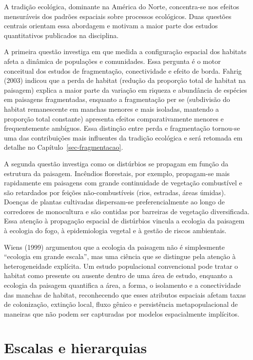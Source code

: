 \documentclass[
  portuguese,
  11pt,
  a4paper,
  open=any]{scrbook}
\begin{document}
A tradição ecológica, dominante na América do Norte, concentra-se nos
efeitos mensuráveis dos padrões espaciais sobre processos ecológicos.
Duas questões centrais orientam essa abordagem e motivam a maior parte
dos estudos quantitativos publicados na disciplina.

A primeira questão investiga em que medida a configuração espacial dos
habitats afeta a dinâmica de populações e comunidades. Essa pergunta é o
motor conceitual dos estudos de fragmentação, conectividade e efeito de
borda. Fahrig (2003) indicou que a perda de habitat (redução da
proporção total de habitat na paisagem) explica a maior parte da
variação em riqueza e abundância de espécies em paisagens fragmentadas,
enquanto a fragmentação per se (subdivisão do habitat remanescente em
manchas menores e mais isoladas, mantendo a proporção total constante)
apresenta efeitos comparativamente menores e frequentemente ambíguos.
Essa distinção entre perda e fragmentação tornou-se uma das
contribuições mais influentes da tradição ecológica e será retomada em
detalhe no Capítulo~\ref{sec-fragmentacao}.

A segunda questão investiga como os distúrbios se propagam em função da
estrutura da paisagem. Incêndios florestais, por exemplo, propagam-se
mais rapidamente em paisagens com grande continuidade de vegetação
combustível e são retardados por feições não-combustíveis (rios,
estradas, áreas úmidas). Doenças de plantas cultivadas dispersam-se
preferencialmente ao longo de corredores de monocultura e são contidas
por barreiras de vegetação diversificada. Essa atenção à propagação
espacial de distúrbios vincula a ecologia da paisagem à ecologia do
fogo, à epidemiologia vegetal e à gestão de riscos ambientais.

Wiens (1999) argumentou que a ecologia da paisagem não é simplesmente
``ecologia em grande escala'', mas uma ciência que se distingue pela
atenção à heterogeneidade explícita. Um estudo populacional convencional
pode tratar o habitat como presente ou ausente dentro de uma área de
estudo, enquanto a ecologia da paisagem quantifica a área, a forma, o
isolamento e a conectividade das manchas de habitat, reconhecendo que
esses atributos espaciais afetam taxas de colonização, extinção local,
fluxo gênico e persistência metapopulacional de maneiras que não podem
ser capturadas por modelos espacialmente implícitos.

\section{Escalas e hierarquias}\label{escalas-e-hierarquias}
\end{document}

